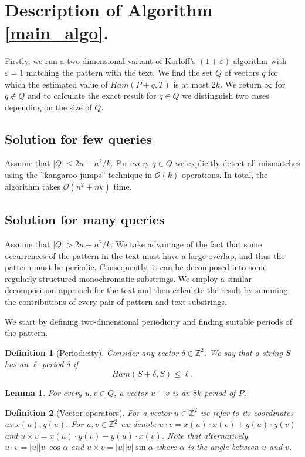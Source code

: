 \documentclass[a4paper]{article}
\newcommand{\Z}{\mathbb{Z}}
\renewcommand{\O}{\mathcal{O}}
\newcommand{\tO}{\tilde{\mathcal{O}}}
\newtheorem{definition}{Definition}
\newtheorem{lemma}{Lemma}[definition]
\begin{document}
\section{Description of Algorithm \ref{main_algo}.}
Firstly, we run a two-dimensional variant of Karloff's $(1 + \varepsilon)$-algorithm with $\varepsilon = 1$ matching the pattern with the text.
We find the set $Q$ of vectors $q$ for which the estimated value of $Ham(P + q, T)$ is at most $2k$.
We return $\infty$ for $q \not \in Q$ and to calculate the exact result for $q \in Q$ we distinguish two cases depending on the size of $Q$.


\subsection{Solution for few queries}
Assume that $|Q| \le 2n + n^2/k$.
For every $q \in Q$ we explicitly detect all mismatches using the ''kangaroo jumps'' technique in $\O(k)$ operations.
In total, the algorithm takes $\tO(n^2 + nk)$ time.


\subsection{Solution for many queries}
Assume that $|Q| > 2n + n^2/k$.
We take advantage of the fact that some occurrences of the pattern in the text must have a large overlap, and thus the pattern must be periodic.
Consequently, it can be decomposed into some regularly structured monochromatic substrings.
We employ a similar decomposition approach for the text and then calculate the result by summing the contributions of every pair of pattern and text substrings.

We start by defining two-dimensional periodicity and finding suitable periods of the pattern.


\begin{definition}[Periodicity]
	Consider any vector $\delta \in \Z^2$.
	We say that a string $S$ has an $\ell$-period $\delta$ if $$ Ham(S + \delta, S) \le \ell. $$
\end{definition}


\begin{lemma} \label{periodicity_lemma}
	For every $u, v \in Q$, a vector $u - v$ is an $8k$-period of $P$.
\end{lemma}


\begin{definition}[Vector operators]
	For a vector $u \in \Z^2$ we refer to its coordinates as $x(u), y(u)$.
	For $u, v \in \Z^2$ we denote $u \cdot v = x(u) \cdot x(v) + y(u) \cdot y(v)$
	and $u \times v = x(u) \cdot y(v) - y(u) \cdot x(v)$.
	Note that alternatively $u \cdot v = |u||v| \cos \alpha$ and $u \times v = |u||v| \sin \alpha$ where $\alpha$ is the angle between $u$ and $v$.
\end{definition}
\end{document}
